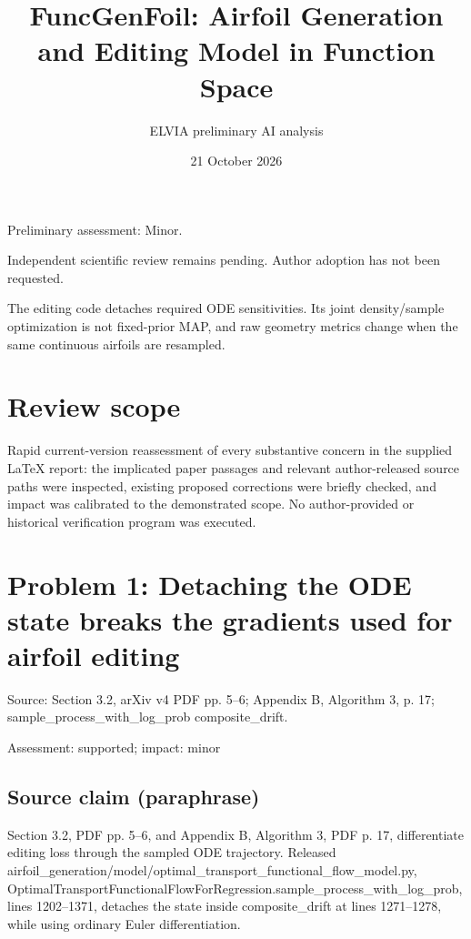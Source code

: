 \documentclass[11pt]{article}
\begin{document}
\title{FuncGenFoil: Airfoil Generation and Editing Model in Function Space}

\author{ELVIA preliminary AI analysis}\date{21 October 2026}\maketitle

Preliminary assessment: Minor.\par

Independent scientific review remains pending. Author adoption has not been requested.

The editing code detaches required ODE sensitivities. Its joint density/sample optimization is not fixed-prior MAP, and raw geometry metrics change when the same continuous airfoils are resampled.

\section*{Review scope}

Rapid current-version reassessment of every substantive concern in the supplied LaTeX report: the implicated paper passages and relevant author-released source paths were inspected, existing proposed corrections were briefly checked, and impact was calibrated to the demonstrated scope. No author-provided or historical verification program was executed.

\section*{Problem 1: Detaching the ODE state breaks the gradients used for airfoil editing}

Source: Section 3.2, arXiv v4 PDF pp. 5–6; Appendix B, Algorithm 3, p. 17; sample\_process\_with\_log\_prob composite\_drift.

Assessment: supported; impact: minor

\subsection*{Source claim (paraphrase)}

Section 3.2, PDF pp. 5–6, and Appendix B, Algorithm 3, PDF p. 17, differentiate editing loss through the sampled ODE trajectory. Released airfoil\_generation/model/optimal\_transport\_functional\_flow\_model.py, OptimalTransportFunctionalFlowForRegression.sample\_process\_with\_log\_prob, lines 1202–1371, detaches the state inside composite\_drift at lines 1271–1278, while using ordinary Euler differentiation.
\end{document}

